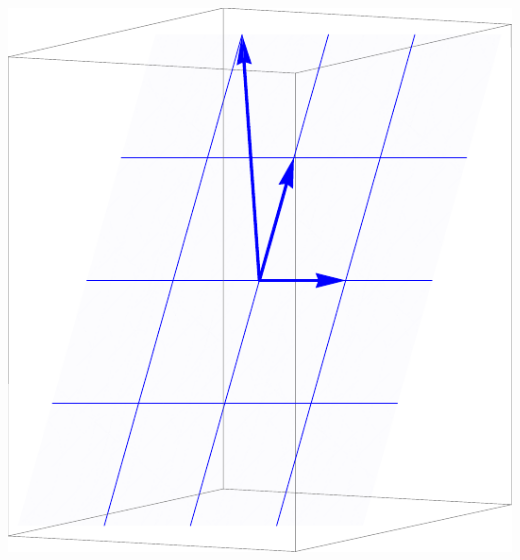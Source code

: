 \begin{example}
{\includegraphics[width=\marginparwidth]{02-Applications/support/colspace1}

}
\end{example}
